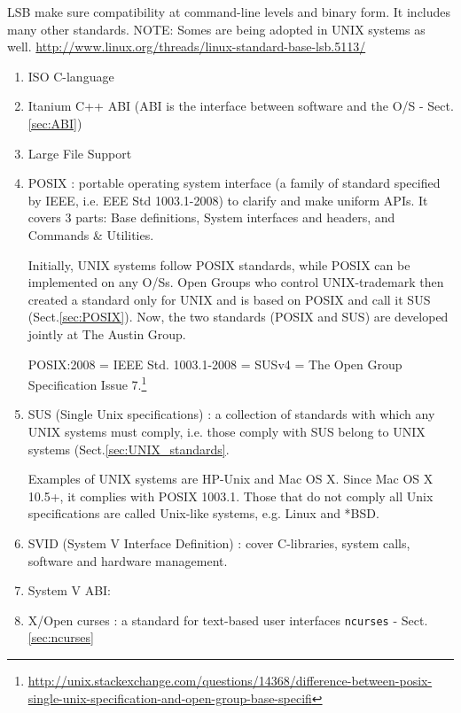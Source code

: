 LSB make sure compatibility at command-line levels and binary form. It includes
many other standards. NOTE: Somes are being adopted in UNIX systems as well.
\url{http://www.linux.org/threads/linux-standard-base-lsb.5113/}
\begin{enumerate}
  \item ISO C-language
  
  \item Itanium C++ ABI (ABI is the interface between software and the O/S -
  Sect.\ref{sec:ABI})
  
  \item Large File Support 
  
  \item POSIX : portable operating system interface (a family of standard
  specified by IEEE, i.e. EEE Std 1003.1-2008) to clarify and make uniform APIs.
  It covers 3 parts: Base definitions, System interfaces and headers,
  and Commands \& Utilities. 
  
Initially, UNIX systems follow POSIX standards, while POSIX can be implemented
on any O/Ss. Open Groups who control UNIX-trademark then created a standard 
only for UNIX and is based on POSIX and call it SUS (Sect.\ref{sec:POSIX}). Now,
the two standards (POSIX and SUS) are developed jointly at The Austin Group.

POSIX:2008 = IEEE Std. 1003.1-2008 = SUSv4 = The Open Group Specification Issue
7.\footnote{\url{http://unix.stackexchange.com/questions/14368/difference-between-posix-single-unix-specification-and-open-group-base-specifi}}
  
  \item SUS (Single Unix specifications) : a collection of standards with which
  any UNIX systems must comply, i.e. those comply with SUS belong to UNIX
  systems (Sect.\ref{sec:UNIX_standards}. 
  
  Examples of UNIX systems are HP-Unix and Mac OS X. Since Mac OS X 10.5+, it
  complies with POSIX 1003.1. Those that do not comply all Unix specifications
  are called Unix-like systems, e.g. Linux and *BSD.

  
  \item SVID (System V Interface Definition) : cover C-libraries, system calls,
  software and hardware management.
  
  \item System V ABI:
  
  \item X/Open curses : a standard for text-based user interfaces \verb!ncurses!
  - Sect.\ref{sec:ncurses}
  

\end{enumerate}
